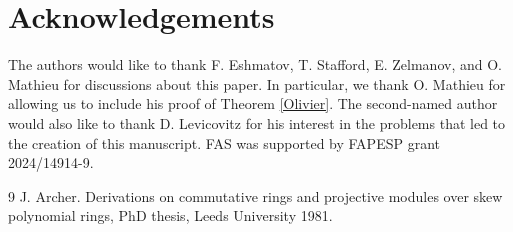 \documentclass[12pt, a4paper]{amsart}
\begin{document}
\section*{Acknowledgements}
The authors would like to thank F. Eshmatov, T. Stafford, E. Zelmanov, and O. Mathieu for discussions about this paper. In particular, we thank O. Mathieu for allowing us to include his proof of Theorem \ref{Olivier}. The second-named author would also like to thank D. Levicovitz for his interest in the problems that led to the creation of this manuscript. FAS was supported by FAPESP grant 2024/14914-9. 

\begin{thebibliography}{9}
 J. Archer. Derivations on commutative rings and projective modules over skew polynomial
rings, PhD thesis, Leeds University 1981.

\end{thebibliography}
\end{document}
